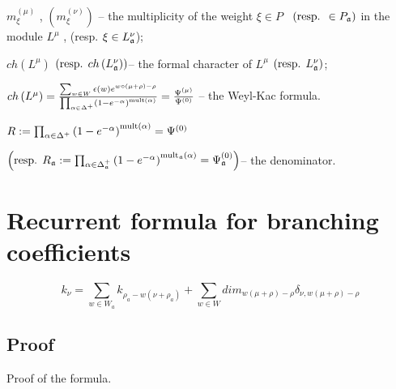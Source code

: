 \documentclass[a4paper,12pt]{article}
\theoremstyle{definition} \newtheorem{Def}{Definition}
\begin{document}
$m_{\xi }^{\left( \mu \right) }$ , $\left( m_{\xi }^{\left( \nu \right)
}\right) $ -- the multiplicity of the weight $\xi \in P$ \ $\left( \text{%
resp. }\in P_{\frak{a}}\right) $ in the module $L^{\mu }$ , (resp. $\xi \in
L_{\frak{a}}^{\nu } $);

$ch\left( L^{\mu }\right) $ $\left( \text{resp. }ch\left( L_{\frak{a}}^{\nu
}\right) \right) $-- the formal character of $L^{\mu }$ $\left( \text{resp. }%
L_{\frak{a}}^{\nu }\right) $;

$ch\left( L^{\mu }\right) =\frac{\sum_{w\in W}\epsilon (w)e^{w\circ (\mu
+\rho )-\rho }}{\prod_{\alpha \in \Delta ^{+}}\left( 1-e^{-\alpha }\right) ^{%
\mathrm{{mult}\left( \alpha \right) }}}=\frac{\Psi ^{\left( \mu \right) }}{%
\Psi ^{\left( 0\right) }}$ -- the Weyl-Kac formula.

$R:=\prod_{\alpha \in \Delta ^{+}}\left( 1-e^{-\alpha }\right) ^{\mathrm{{%
mult}\left( \alpha \right) }}=\Psi ^{\left( 0\right) }\quad $

\noindent $\left( \text{resp. }R_{\frak{a}}:=\prod_{\alpha \in \Delta _{%
\frak{a}}^{+}}\left( 1-e^{-\alpha }\right) ^{\mathrm{mult}_{\frak{a}}\mathrm{%
\left( \alpha \right) }}=\Psi _{\frak{a}}^{\left( 0\right) }\right) $-- the
denominator.


\section{Recurrent formula for branching coefficients}
\label{sec:recurr-form-branch}

\begin{equation}
  \label{eq:1}
  k_{\nu}=\sum_{w\in W_a} k_{\rho_a-w(\nu+\rho_a)} + \sum_{w\in W}dim_{w(\mu+\rho)-\rho} \delta_{\nu,w(\mu+\rho)-\rho}
\end{equation}

\subsection{Proof}
\label{sec:proof}
Proof of the formula.
\end{document}
